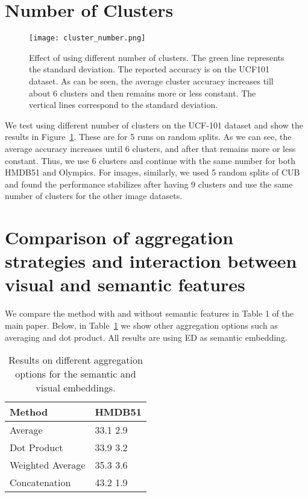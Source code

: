 \documentclass[runningheads]{llncs}
\begin{document}
\section{Number of Clusters}
\label{sec:nClusters}

\begin{figure}[htb]
    \centering
    \texttt{[image: cluster\_number.png]}
    \caption{Effect of using different number of clusters. The green line represents the standard deviation. The reported accuracy is on the UCF101 dataset. As can be seen, the average cluster accuracy increases till about 6 clusters and then remains more or less constant. The vertical lines correspond to the standard deviation.}
    \label{fig:cluster_number}
\end{figure}

We test using different number of clusters on the UCF-101 dataset and show the results in Figure~\ref{fig:cluster_number}. These are for 5 runs on random splits. As we can see, the average accuracy increases until 6 clusters, and after that remains more or less constant. Thus, we use 6 clusters and continue with the same number for both HMDB51 and Olympics. For images, similarly, we used 5 random splits of CUB and found the performance stabilizes after having 9 clusters and use the same number of clusters for the other image datasets. 



\section{Comparison of aggregation strategies and interaction between visual and semantic features}
\label{sec:ablation}

We compare the method with and without semantic features in Table 1 of the main paper. Below, in Table~\ref{tab:multimodalinteraction} we show other aggregation options such as averaging and dot product. All results are using ED as semantic embedding.  
\begin{table}[htb]
\centering
\begin{tabular}{|l|l|}
\hline
\multicolumn{1}{|l|}{Method} & \multicolumn{1}{l|}{HMDB51} \\ \hline
Average                      &       33.1  2.9                      \\
Dot Product                  &       33.9  3.2                      \\
Weighted Average             &       35.3  3.6                      \\
Concatenation                &       43.2  1.9              \\
\hline
\end{tabular}
\caption{Results on different aggregation options for the semantic and visual embeddings.}
\label{tab:multimodalinteraction}
\end{table}
\end{document}
